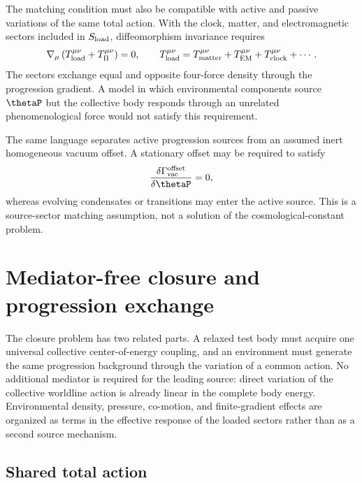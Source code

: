\documentclass[12pt]{article}
\begin{document}
The matching condition must also be compatible with active and passive variations of the same total action.  With the clock, matter, and electromagnetic sectors included in \(S_{\rm load}\), diffeomorphism invariance requires
\begin{equation}
    \nabla_\mu
    \left(T_{\rm load}^{\mu\nu}+T_\Pi^{\mu\nu}\right)=0,
    \qquad
    T_{\rm load}^{\mu\nu}
    =T_{\rm matter}^{\mu\nu}+T_{\rm EM}^{\mu\nu}+T_{\rm clock}^{\mu\nu}+\cdots .
    \label{eq:total-momentum-conservation}
\end{equation}
The sectors exchange equal and opposite four-force density through the progression gradient.  A model in which environmental components source \(\thetaP\) but the collective body responds through an unrelated phenomenological force would not satisfy this requirement.

The same language separates active progression sources from an assumed inert homogeneous vacuum offset.  A stationary offset may be required to satisfy
\begin{equation}
    \frac{\delta\Gamma_{\rm vac}^{\rm offset}}{\delta\thetaP}=0,
    \label{eq:normalized-vacuum-neutrality-matching}
\end{equation}
whereas evolving condensates or transitions may enter the active source.  This is a source-sector matching assumption, not a solution of the cosmological-constant problem.
\section{Mediator-free closure and progression exchange}
\label{sec:microscopic-closure}

The closure problem has two related parts.  A relaxed test body must acquire one universal collective center-of-energy coupling, and an environment must generate the same progression background through the variation of a common action.  No additional mediator is required for the leading source: direct variation of the collective worldline action is already linear in the complete body energy.  Environmental density, pressure, co-motion, and finite-gradient effects are organized as terms in the effective response of the loaded sectors rather than as a second source mechanism.

\subsection{Shared total action}
\end{document}
